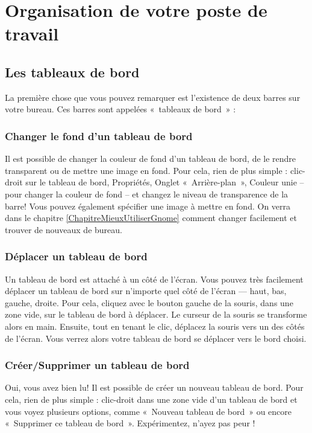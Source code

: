 \section{Organisation de votre poste de travail}
\subsection{Les tableaux de bord}
La première chose que vous pouvez remarquer est l'existence de deux barres sur votre bureau. Ces barres sont appelées «~tableaux de bord~» :
\subsubsection{Changer le fond d'un tableau de bord}
Il est possible de changer la couleur de fond d'un tableau de bord, de le rendre transparent ou de mettre une image en fond. Pour cela, rien de plus simple : clic-droit sur le tableau de bord, Propriétés, Onglet «~Arrière-plan~», Couleur unie -- pour changer la couleur de fond -- et changez le niveau de transparence de la barre! Vous pouvez également spécifier une image à mettre en fond. On verra dans le chapitre \ref{ChapitreMieuxUtiliserGnome} comment changer facilement et trouver de nouveaux  de bureau.
\subsubsection{Déplacer un tableau de bord}
Un tableau de bord est attaché à un côté de l'écran. Vous pouvez très facilement déplacer un tableau de bord sur n'importe quel côté de l'écran --- haut, bas, gauche, droite. Pour cela, cliquez avec le bouton gauche de la souris, dans une zone vide, sur le tableau de bord à déplacer. Le curseur de la souris se transforme alors en main. Ensuite, tout en tenant le clic, déplacez la souris vers un des côtés de l'écran. Vous verrez alors votre tableau de bord se déplacer vers le bord choisi.
\subsubsection{Créer/Supprimer un tableau de bord}
Oui, vous avez bien lu! Il est possible de créer un nouveau tableau de bord. Pour cela, rien de plus simple : clic-droit dans une zone vide d'un tableau de bord et vous voyez plusieurs options, comme «~Nouveau tableau de bord~» ou encore «~Supprimer ce tableau de bord~». Expérimentez, n'ayez pas peur !
